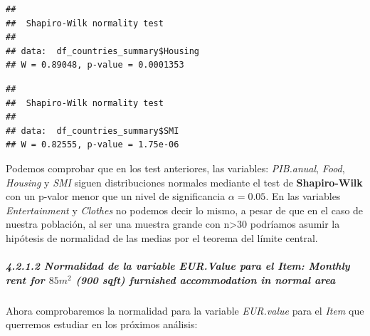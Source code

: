 \documentclass[
]{article}
\newenvironment{Shaded}{\begin{snugshade}}{\end{snugshade}}
\newcommand{\FunctionTok}[1]{\textcolor[rgb]{0.13,0.29,0.53}{\textbf{#1}}}
\newcommand{\NormalTok}[1]{#1}
\newcommand{\SpecialCharTok}[1]{\textcolor[rgb]{0.81,0.36,0.00}{\textbf{#1}}}
\begin{document}
\begin{Shaded}
\end{Shaded}

\begin{verbatim}
## 
##  Shapiro-Wilk normality test
## 
## data:  df_countries_summary$Housing
## W = 0.89048, p-value = 0.0001353
\end{verbatim}

\begin{Shaded}
\end{Shaded}

\begin{verbatim}
## 
##  Shapiro-Wilk normality test
## 
## data:  df_countries_summary$SMI
## W = 0.82555, p-value = 1.75e-06
\end{verbatim}

Podemos comprobar que en los test anteriores, las variables:
\emph{PIB.anual}, \emph{Food}, \emph{Housing} y \emph{SMI} siguen
distribuciones normales mediante el test de \textbf{Shapiro-Wilk} con un
p-valor menor que un nivel de significancia \(\alpha=0.05\). En las
variables \emph{Entertainment} y \emph{Clothes} no podemos decir lo
mismo, a pesar de que en el caso de nuestra población, al ser una
muestra grande con n\textgreater30 podríamos asumir la hipótesis de
normalidad de las medias por el teorema del límite central.

\hypertarget{normalidad-de-la-variable-eur.value-para-el-item-monthly-rent-for-85-m2-900-sqft-furnished-accommodation-in-normal-area}{%
\subparagraph{\texorpdfstring{4.2.1.2 Normalidad de la variable
EUR.Value para el Item: Monthly rent for \(85 m^{2}\) (900 sqft)
furnished accommodation in normal
area}{4.2.1.2 Normalidad de la variable EUR.Value para el Item: Monthly rent for 85 m\^{}\{2\} (900 sqft) furnished accommodation in normal area}}\label{normalidad-de-la-variable-eur.value-para-el-item-monthly-rent-for-85-m2-900-sqft-furnished-accommodation-in-normal-area}}

\hfill\break

Ahora comprobaremos la normalidad para la variable \emph{EUR.value} para
el \emph{Item} que querremos estudiar en los próximos análisis:
\end{document}
